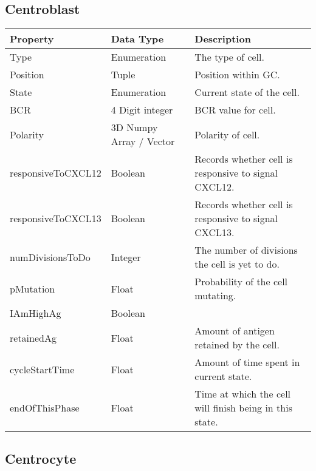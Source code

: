 \documentclass[english]{article}
\begin{document}
\subsection{Centroblast}

\begin{center}
\begin{tabular}{|C{2.1in}|C{2.1in}|C{2.1in}|}

\hline
\textbf{Property} & \textbf{Data Type} & \textbf{Description}
\tabularnewline
\hline
\hline
Type & Enumeration & The type of cell. 
\tabularnewline
\hline
Position & Tuple & Position within GC.
\tabularnewline
\hline
State & Enumeration & Current state of the cell. 
\tabularnewline
\hline
BCR & 4 Digit integer & BCR value for cell.
\tabularnewline
\hline
Polarity & 3D Numpy Array / Vector & Polarity of cell.
\tabularnewline
\hline
responsiveToCXCL12 & Boolean & Records whether cell is responsive to signal CXCL12.
\tabularnewline
\hline
responsiveToCXCL13 & Boolean & Records whether cell is responsive to signal CXCL13.
\tabularnewline
\hline
numDivisionsToDo & Integer & The number of divisions the cell is yet to do. 
\tabularnewline
\hline 
pMutation & Float & Probability of the cell mutating. 
\tabularnewline
\hline
IAmHighAg & Boolean & 
\tabularnewline
\hline
retainedAg & Float & Amount of antigen retained by the cell. 
\tabularnewline
\hline
cycleStartTime & Float & Amount of time spent in current state. 
\tabularnewline
\hline
endOfThisPhase & Float & Time at which the cell will finish being in this state. 
\tabularnewline
\hline

\end{tabular}
\end{center}


\subsection{Centrocyte}
\end{document}
